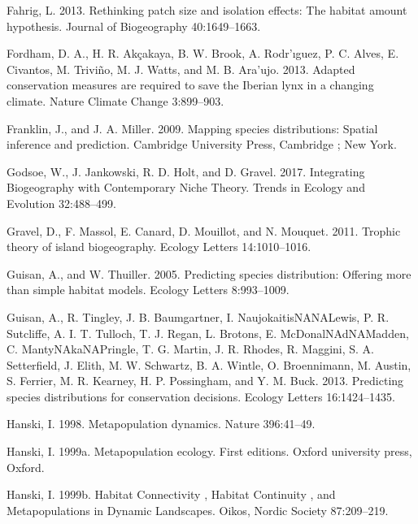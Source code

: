 \documentclass[12pt]{article}
\newlength{\cslhangindent}
\newenvironment{cslreferences}%
  {\setlength{\parindent}{0pt}%
  \everypar{\setlength{\hangindent}{\cslhangindent}}\ignorespaces}%
  {\par}
\begin{document}
\begin{cslreferences}
\leavevmode\hypertarget{ref-fahrig_rethinking_2013}{}%
Fahrig, L. 2013. Rethinking patch size and isolation effects: The
habitat amount hypothesis. Journal of Biogeography 40:1649--1663.

\leavevmode\hypertarget{ref-fordham_adapted_2013}{}%
Fordham, D. A., H. R. Akçakaya, B. W. Brook, A. Rodr\a'ıguez, P. C.
Alves, E. Civantos, M. Triviño, M. J. Watts, and M. B. Ara\a'ujo. 2013.
Adapted conservation measures are required to save the Iberian lynx in a
changing climate. Nature Climate Change 3:899--903.

\leavevmode\hypertarget{ref-franklin_mapping_2009}{}%
Franklin, J., and J. A. Miller. 2009. Mapping species distributions:
Spatial inference and prediction. Cambridge University Press, Cambridge
; New York.

\leavevmode\hypertarget{ref-godsoe_integrating_2017}{}%
Godsoe, W., J. Jankowski, R. D. Holt, and D. Gravel. 2017. Integrating
Biogeography with Contemporary Niche Theory. Trends in Ecology and
Evolution 32:488--499.

\leavevmode\hypertarget{ref-gravel_trophic_2011}{}%
Gravel, D., F. Massol, E. Canard, D. Mouillot, and N. Mouquet. 2011.
Trophic theory of island biogeography. Ecology Letters 14:1010--1016.

\leavevmode\hypertarget{ref-guisan_predicting_2005}{}%
Guisan, A., and W. Thuiller. 2005. Predicting species distribution:
Offering more than simple habitat models. Ecology Letters 8:993--1009.

\leavevmode\hypertarget{ref-guisan_predicting_2013}{}%
Guisan, A., R. Tingley, J. B. Baumgartner, I. NaujokaitisNANALewis, P.
R. Sutcliffe, A. I. T. Tulloch, T. J. Regan, L. Brotons, E.
McDonalNAdNAMadden, C. MantyNAkaNAPringle, T. G. Martin, J. R. Rhodes,
R. Maggini, S. A. Setterfield, J. Elith, M. W. Schwartz, B. A. Wintle,
O. Broennimann, M. Austin, S. Ferrier, M. R. Kearney, H. P. Possingham,
and Y. M. Buck. 2013. Predicting species distributions for conservation
decisions. Ecology Letters 16:1424--1435.

\leavevmode\hypertarget{ref-hanski_metapopulation_1998}{}%
Hanski, I. 1998. Metapopulation dynamics. Nature 396:41--49.

\leavevmode\hypertarget{ref-hanski_metapopulation_1999}{}%
Hanski, I. 1999a. Metapopulation ecology. First editions. Oxford
university press, Oxford.

\leavevmode\hypertarget{ref-hanski_habitat_1999}{}%
Hanski, I. 1999b. Habitat Connectivity , Habitat Continuity , and
Metapopulations in Dynamic Landscapes. Oikos, Nordic Society
87:209--219.


\end{cslreferences}
\end{document}
